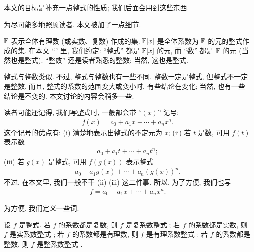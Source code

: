 \subsection*{\SomePropertiesOfPolynomials}
\markright{\SomePropertiesOfPolynomials}

本文的目标是补充一点整式的性质; 我们后面会用到这些东西.

为尽可能多地照顾读者, 本文被加了一点细节.

$\mathbb{F}$ 表示全体有理数 (或实数、复数) 作成的集. $\mathbb{F}[x]$ 是全体系数为 $\mathbb{F}$ 的元的整式作成的集. 在本文 ``\SomePropertiesOfPolynomials'' 里, 我们约定: ``整式'' 都是 $\mathbb{F}[x]$ 的元, 而 ``数'' 都是 $\mathbb{F}$ 的元 (当然也是整式). ``整数'' 还是读者熟悉的整数; 当然, 这也是整式.

整式与整数类似. 不过, 整式与整数也有一些不同. 整数一定是整式, 但整式不一定是整数. 而且, 整式的系数的范围变大或变小时, 有些结论在变化; 当然, 也有一些结论是不变的. 本文讨论的内容会稍多一些.

读者可能还记得, 我们写整式时, 一般都会带 ``$(x)$'' 记号:
\begin{align*}
    f(x) = a_0 + a_1 x + \cdots + a_n x^n.
\end{align*}
这个记号的优点有: (i) 清楚地表示出整式的不定元为 $x$; (ii) 若 $t$ 是数, 可用 $f(t)$ 表示数
\begin{align*}
    a_0 + a_1 t + \cdots + a_n t^n;
\end{align*}
(iii) 若 $g(x)$ 是整式, 可用 $f(g(x))$ 表示整式
\begin{align*}
    a_0 + a_1 g(x) + \cdots + a_n (g(x))^n.
\end{align*}
不过, 在本文里, 我们一般不干 (ii) (iii) 这二件事. 所以, 为了方便, 我们也写
\begin{align*}
    f = a_0 + a_1 x + \cdots + a_n x^n.
\end{align*}

为方便, 我们定义一些词.

\begin{definition}
    设 $f$ 是整式. 若 $f$ 的系数都是复数, 则 $f$ 是复系数整式 ; 若 $f$ 的系数都是实数, 则 $f$ 是实系数整式 ; 若 $f$ 的系数都是有理数, 则 $f$ 是有理系数整式 ; 若 $f$ 的系数都是整数, 则 $f$ 是整系数整式 .
\end{definition}

